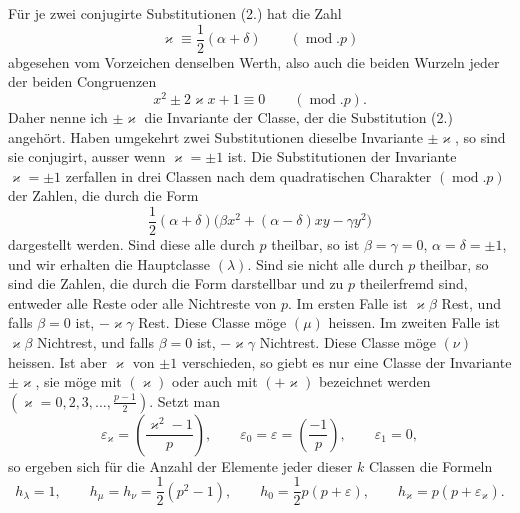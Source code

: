 \documentclass[11pt]{article}
\begin{document}
Für je zwei conjugirte Substitutionen (2.) hat die Zahl
\begin{equation*}\tag{6.}
\varkappa\equiv \frac12(\alpha+\delta)\qquad(\operatorname{mod}.p)
\end{equation*}
abgesehen vom Vorzeichen denselben Werth, also auch die beiden Wurzeln jeder der beiden Congruenzen
\begin{equation*}\tag{7.}
x^2\pm2\varkappa x+1\equiv0\qquad(\operatorname{mod}.p).
\end{equation*}
Daher nenne ich $\pm\varkappa$ die Invariante der Classe, der die Substitution (2.) angehört. Haben umgekehrt zwei Substitutionen dieselbe Invariante $\pm\varkappa$, so sind sie conjugirt, ausser wenn $\varkappa=\pm1$ ist. Die Substitutionen der Invariante $\varkappa=\pm1$ zerfallen in drei Classen nach dem quadratischen Charakter $(\operatorname{mod}.p)$ der Zahlen, die durch die Form
\begin{equation*}\tag{8.}
\frac12(\alpha+\delta)\bigl(\beta x^2+(\alpha-\delta)xy-\gamma y^2\bigr)
\end{equation*}
dargestellt werden. Sind diese alle durch $p$ theilbar, so ist $\beta=\gamma=0$, $\alpha=\delta=\pm1$, und wir erhalten die Hauptclasse $(\lambda)$. Sind sie nicht alle durch $p$ theilbar, so sind die Zahlen, die durch die Form darstellbar und zu $p$ theilerfremd sind, entweder alle Reste oder alle Nichtreste von $p$. Im ersten Falle ist $\varkappa\beta$ Rest, und falls $\beta=0$ ist, $-\varkappa\gamma$ Rest. Diese Classe möge $(\mu)$ heissen. Im zweiten Falle ist $\varkappa\beta$ Nichtrest, und falls $\beta=0$ ist, $-\varkappa\gamma$ Nichtrest. Diese Classe möge $(\nu)$ heissen. Ist aber $\varkappa$ von $\pm1$ verschieden, so giebt es nur eine Classe der Invariante $\pm\varkappa$, sie möge mit $(\varkappa)$ oder auch mit $(+\varkappa)$ bezeichnet werden $\left(\varkappa=0,2,3,\ldots,\frac{p-1}{2}\right)$. Setzt man
\begin{equation*}\tag{9.}
\varepsilon_\varkappa=\left(\frac{\varkappa^2-1}{p}\right),\qquad
\varepsilon_0=\varepsilon=\left(\frac{-1}{p}\right),\qquad
\varepsilon_1=0,
\end{equation*}
so ergeben sich für die Anzahl der Elemente jeder dieser $k$ Classen die Formeln
\begin{equation*}\tag{10.}
h_\lambda=1,\qquad
h_\mu=h_\nu=\frac12(p^2-1),\qquad
h_0=\frac12p(p+\varepsilon),\qquad
h_\varkappa=p(p+\varepsilon_\varkappa).
\end{equation*}
\end{document}
